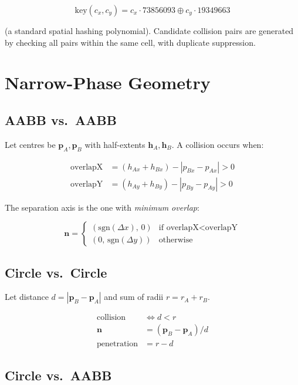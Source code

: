 \documentclass[12pt, a4paper]{report}
\theoremstyle{definition}
\theoremstyle{remark}
\begin{document}
\begin{equation}
\text{key}(c_x, c_y) = c_x \cdot 73856093 \oplus c_y \cdot 19349663
\end{equation}

(a standard spatial hashing polynomial). Candidate collision pairs are
generated by checking all pairs within the same cell, with duplicate
suppression.

\section{Narrow-Phase Geometry}

\subsection{AABB vs.\ AABB}

Let centres be $\mathbf{p}_A, \mathbf{p}_B$ with half-extents
$\mathbf{h}_A, \mathbf{h}_B$. A collision occurs when:

\begin{align}
  \text{overlapX} &= (h_{Ax} + h_{Bx}) - |p_{Bx} - p_{Ax}| > 0 \\
  \text{overlapY} &= (h_{Ay} + h_{By}) - |p_{By} - p_{Ay}| > 0
\end{align}

The separation axis is the one with \emph{minimum overlap}:

\begin{equation}
\mathbf{n} =
\begin{cases}
  (\text{sgn}(\Delta x),\, 0) & \text{if overlapX} < \text{overlapY} \\
  (0,\, \text{sgn}(\Delta y)) & \text{otherwise}
\end{cases}
\end{equation}

\subsection{Circle vs.\ Circle}

Let distance $d = |\mathbf{p}_B - \mathbf{p}_A|$ and sum of radii
$r = r_A + r_B$.

\begin{align}
  \text{collision} &\Leftrightarrow d < r \\
  \mathbf{n} &= (\mathbf{p}_B - \mathbf{p}_A) / d \\
  \text{penetration} &= r - d
\end{align}

\subsection{Circle vs.\ AABB}
\end{document}
